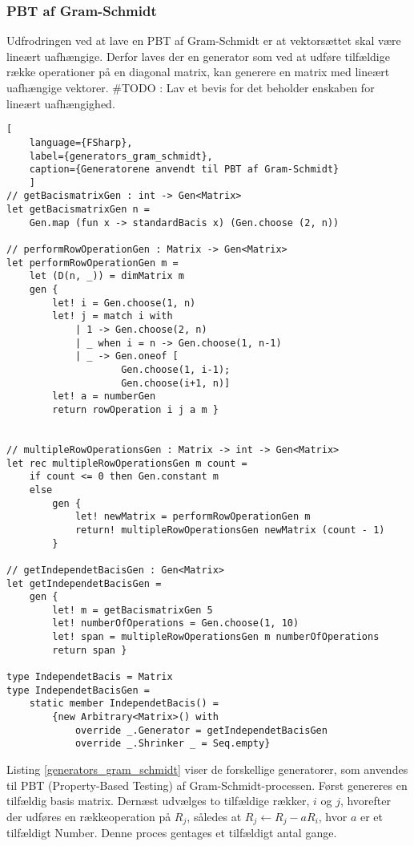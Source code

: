 \subsubsection{PBT af Gram-Schmidt}
Udfrodringen ved at lave en PBT af Gram-Schmidt er at vektorsættet skal være lineært uafhængige. Derfor laves der en generator som ved at udføre tilfældige række operationer på en diagonal matrix, kan generere en matrix med lineært uafhængige vektorer. 
\#TODO : Lav et bevis for det beholder enskaben for lineært uafhængighed.

\begin{lstlisting}[
    language={FSharp}, 
    label={generators_gram_schmidt}, 
    caption={Generatorene anvendt til PBT af Gram-Schmidt}
    ]
// getBacismatrixGen : int -> Gen<Matrix>
let getBacismatrixGen n =
    Gen.map (fun x -> standardBacis x) (Gen.choose (2, n))

// performRowOperationGen : Matrix -> Gen<Matrix>
let performRowOperationGen m =
    let (D(n, _)) = dimMatrix m
    gen { 
        let! i = Gen.choose(1, n)
        let! j = match i with
            | 1 -> Gen.choose(2, n)
            | _ when i = n -> Gen.choose(1, n-1)
            | _ -> Gen.oneof [
                    Gen.choose(1, i-1); 
                    Gen.choose(i+1, n)]
        let! a = numberGen
        return rowOperation i j a m }


// multipleRowOperationsGen : Matrix -> int -> Gen<Matrix>
let rec multipleRowOperationsGen m count =
    if count <= 0 then Gen.constant m
    else
        gen {
            let! newMatrix = performRowOperationGen m
            return! multipleRowOperationsGen newMatrix (count - 1)
        }

// getIndependetBacisGen : Gen<Matrix>
let getIndependetBacisGen =
    gen { 
        let! m = getBacismatrixGen 5
        let! numberOfOperations = Gen.choose(1, 10)
        let! span = multipleRowOperationsGen m numberOfOperations
        return span }

type IndependetBacis = Matrix
type IndependetBacisGen =
    static member IndependetBacis() =
        {new Arbitrary<Matrix>() with
            override _.Generator = getIndependetBacisGen
            override _.Shrinker _ = Seq.empty}
\end{lstlisting}

Listing \ref{generators_gram_schmidt} viser de forskellige generatorer, som anvendes til PBT (Property-Based Testing) af Gram-Schmidt-processen. Først genereres en tilfældig basis matrix. Dernæst udvælges to tilfældige rækker, \(i\) og \(j\), hvorefter der udføres en rækkeoperation på \(R_j\), således at \(R_j \leftarrow R_j - aR_i\), hvor $a$ er et tilfældigt Number. Denne proces gentages et tilfældigt antal gange.


